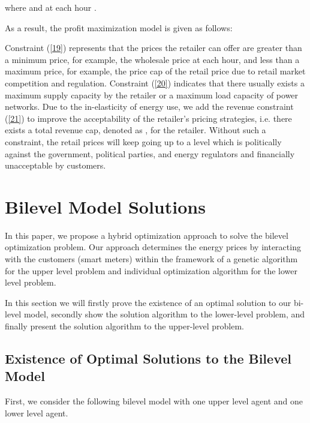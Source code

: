 \documentclass[10pt,journal]{IEEEtran}
\theoremstyle{definition}
\theoremstyle{plain} \newtheorem{theo}{Theorem} \newtheorem{prop}{Proposition}  \newtheorem{lemm}{Lemma}
\begin{document}
where  and  at each hour .

As a result, the profit maximization model is given as follows:


Constraint (\ref{19}) represents that the prices the retailer can offer are greater than a minimum price, for example, the wholesale price at each hour, and less than a maximum price, for example, the price cap of the retail price due to retail market competition and regulation. Constraint (\ref{20}) indicates that there usually exists a maximum supply capacity by the retailer or a maximum load capacity of power networks. Due to the in-elasticity of energy use, we add the revenue constraint (\ref{21}) to improve the  acceptability of the retailer's pricing strategies, i.e. there exists a total revenue cap, denoted as , for the retailer. Without such a constraint, the retail prices will keep going up to a level which is politically against the government, political parties, and energy regulators and financially unacceptable by customers. 



\section{Bilevel Model Solutions} \label{model_solution}



In this paper, we propose a hybrid optimization approach to solve the bilevel optimization problem. Our approach determines the energy prices by interacting with the customers (smart meters) within the framework of a genetic algorithm for the upper level problem and individual optimization algorithm for the lower level problem. 

In this section we will firstly prove the existence of an optimal solution to our bi-level model, secondly show the solution algorithm to the lower-level problem, and finally present the solution algorithm to the upper-level problem. 









\subsection{Existence of Optimal Solutions to the Bilevel Model} \label{existence}
First, we consider the following bilevel model with one upper level agent and one lower level agent. \\
\end{document}

